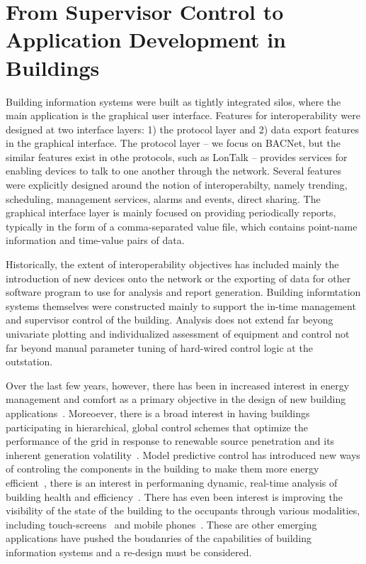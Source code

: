 \section{From Supervisor Control to Application Development in Buildings}


Building information systems were built as tightly integrated silos, where the main application is the graphical user interface.
Features for interoperability were designed at two interface layers: 1) the protocol layer and 2) data export features in the 
graphical interface.  The protocol layer -- we focus on BACNet, but the similar features exist in othe protocols, such as LonTalk --
provides services for enabling devices to talk to one another through the network.  Several features were explicitly designed around
the notion of interoperabilty, namely trending, scheduling, management services, alarms and events, direct sharing.  The graphical
interface layer is mainly focused on providing periodically reports, typically in the form of a comma-separated value file, which
contains point-name information and time-value pairs of data.

Historically, the extent of interoperability objectives has included mainly the introduction of new devices onto the network or
the exporting of data for other software program to use for analysis and report generation.  Building informtation systems themselves
were constructed mainly to support the in-time management and supervisor control of the building.  Analysis does not 
extend far beyong univariate plotting and individualized assessment of equipment and control not far beyond manual parameter tuning
of hard-wired control logic at the outstation.

Over the last few years, however, there has been in increased interest in energy management and comfort as a primary objective 
in the design of new building applications~\cite{}.  Moreoever, there is a broad interest in having buildings participating in hierarchical, 
global control schemes that optimize the performance of the grid in response to renewable source penetration and its inherent 
generation volatility~\cite{}.  Model predictive control has introduced new ways of controling the components in the building
to make them more energy efficient~\cite{mpc}, there is an interest in performaning dynamic, real-time analysis of building health
and efficiency~\cite{dynamicLeed}.  There has even been interest is improving the visibility of the state of the building to the 
occupants through various modalities, including touch-screens~\cite{} and mobile phones~\cite{andrew_lighting, buildsys1, buildsys2}.  
These are other emerging applications
have pushed the boudanries of the capabilities of building information systems and a re-design must be considered.